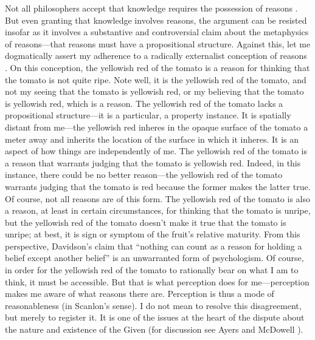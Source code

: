 \documentclass[12pt]{article}
\begin{document}
Not all philosophers accept that knowledge requires the possession of reasons \citep[see][]{Pryor:2007fk}. But even granting that knowledge involves reasons, the argument can be resisted insofar as it involves a substantive and controversial claim about the metaphysics of reasons---that reasons must have a propositional structure. Against this, let me dogmatically assert my adherence to a radically externalist conception of reasons \citep[see][]{Scanlon:1998hb,Raz:2000tm}. On this conception, the yellowish red of the tomato is a reason for thinking that the tomato is not quite ripe. Note well, it is the yellowish red of the tomato, and not my seeing that the tomato is yellowish red, or my believing that the tomato is yellowish red, which is a reason. The yellowish red of the tomato lacks a propositional structure---it is a particular, a property instance. It is spatially distant from me---the yellowish red inheres in the opaque surface of the tomato a meter away and inherits the location of the surface in which it inheres. It is an aspect of how things are independently of me. The yellowish red of the tomato is a reason that warrants judging that the tomato is yellowish red. Indeed, in this instance, there could be no better reason---the yellowish red of the tomato warrants judging that the tomato is red because the former makes the latter true. Of course, not all reasons are of this form. The yellowish red of the tomato is also a reason, at least in certain circumstances, for thinking that the tomato is unripe, but the yellowish red of the tomato doesn't make it true that the tomato is unripe; at best, it is sign or symptom of the fruit's relative maturity. From this perspective, Davidson's \citeyearpar[310]{Davidson:1986uq} claim that ``nothing can count as a reason for holding a belief except another belief'' is an unwarranted form of psychologism. Of course, in order for the yellowish red of the tomato to rationally bear on what I am to think, it must be accessible. But that is what perception does for me---perception makes me aware of what reasons there are. Perception is thus a mode of reasonableness (in Scanlon's \citeyear[]{Scanlon:1998hb} sense). I do not mean to resolve this disagreement, but merely to register it. It is one of the issues at the heart of the dispute about the nature and existence of the Given (for discussion see Ayers \citeyear{Ayers:2004kx} and McDowell \citeyear{McDowell:2006vn}).
\end{document}
